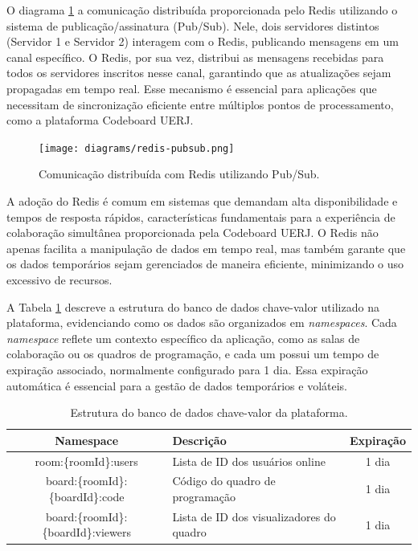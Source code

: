 O diagrama \ref{fig:redis-pubsub} a comunicação distribuída proporcionada pelo Redis utilizando o sistema de publicação/assinatura (Pub/Sub). Nele, dois servidores distintos (Servidor 1 e Servidor 2) interagem com o Redis, publicando mensagens em um canal específico. O Redis, por sua vez, distribui as mensagens recebidas para todos os servidores inscritos nesse canal, garantindo que as atualizações sejam propagadas em tempo real. Esse mecanismo é essencial para aplicações que necessitam de sincronização eficiente entre múltiplos pontos de processamento, como a plataforma Codeboard UERJ.

\begin{figure}[H]
    \centering
    \texttt{[image: diagrams/redis-pubsub.png]}
    \caption{Comunicação distribuída com Redis utilizando Pub/Sub.}
    \label{fig:redis-pubsub}
\end{figure}



A adoção do Redis é comum em sistemas que demandam alta disponibilidade e tempos de resposta rápidos, características fundamentais para a experiência de colaboração simultânea proporcionada pela Codeboard UERJ. O Redis não apenas facilita a manipulação de dados em tempo real, mas também garante que os dados temporários sejam gerenciados de maneira eficiente, minimizando o uso excessivo de recursos.

A Tabela \ref{tab:key-value-database} descreve a estrutura do banco de dados chave-valor utilizado na plataforma, evidenciando como os dados são organizados em \emph{namespaces}. Cada \emph{namespace} reflete um contexto específico da aplicação, como as salas de colaboração ou os quadros de programação, e cada um possui um tempo de expiração associado, normalmente configurado para 1 dia. Essa expiração automática é essencial para a gestão de dados temporários e voláteis.

\begin{table}[H]
    \centering
    \renewcommand{\arraystretch}{1.3} 
    \begin{tabular}{|c|p{6cm}|c|}
        \hline
        \textbf{Namespace}                   & \textbf{Descrição}                       & \textbf{Expiração} \\
        \hline
        room:\{roomId\}:users                & Lista de ID dos usuários online          & 1 dia              \\
        \hline
        board:\{roomId\}:\{boardId\}:code    & Código do quadro de programação          & 1 dia              \\
        \hline
        board:\{roomId\}:\{boardId\}:viewers & Lista de ID dos visualizadores do quadro & 1 dia              \\ 
        
        \hline
    \end{tabular}
    \caption{Estrutura do banco de dados chave-valor da plataforma.}
    \label{tab:key-value-database}
\end{table}

